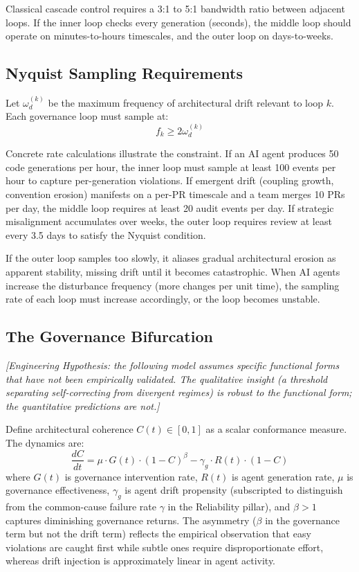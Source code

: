 \documentclass[11pt, a4paper]{googledeepmind}
\begin{document}
Classical cascade control requires a 3:1 to 5:1 bandwidth ratio between adjacent loops. If the inner loop checks every generation (seconds), the middle loop should operate on minutes-to-hours timescales, and the outer loop on days-to-weeks.

\subsection{Nyquist Sampling Requirements}

Let $\omega_d^{(k)}$ be the maximum frequency of architectural drift relevant to loop $k$. Each governance loop must sample at:
\begin{equation}
    f_k \geq 2\omega_d^{(k)}
\end{equation}

Concrete rate calculations illustrate the constraint. If an AI agent produces 50 code generations per hour, the inner loop must sample at least 100 events per hour to capture per-generation violations. If emergent drift (coupling growth, convention erosion) manifests on a per-PR timescale and a team merges 10 PRs per day, the middle loop requires at least 20 audit events per day. If strategic misalignment accumulates over weeks, the outer loop requires review at least every 3.5 days to satisfy the Nyquist condition.

If the outer loop samples too slowly, it aliases gradual architectural erosion as apparent stability, missing drift until it becomes catastrophic. When AI agents increase the disturbance frequency (more changes per unit time), the sampling rate of each loop must increase accordingly, or the loop becomes unstable.

\subsection{The Governance Bifurcation}

\emph{[Engineering Hypothesis: the following model assumes specific functional forms that have not been empirically validated. The qualitative insight (a threshold separating self-correcting from divergent regimes) is robust to the functional form; the quantitative predictions are not.]}

Define architectural coherence $C(t) \in [0,1]$ as a scalar conformance measure. The dynamics are:
\begin{equation}
    \frac{dC}{dt} = \mu \cdot G(t) \cdot (1 - C)^\beta - \gamma_g \cdot R(t) \cdot (1 - C)
\end{equation}
where $G(t)$ is governance intervention rate, $R(t)$ is agent generation rate, $\mu$ is governance effectiveness, $\gamma_g$ is agent drift propensity (subscripted to distinguish from the common-cause failure rate $\gamma$ in the Reliability pillar), and $\beta > 1$ captures diminishing governance returns. The asymmetry ($\beta$ in the governance term but not the drift term) reflects the empirical observation that easy violations are caught first while subtle ones require disproportionate effort, whereas drift injection is approximately linear in agent activity.
\end{document}
